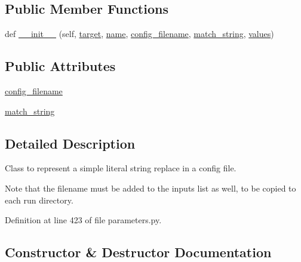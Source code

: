 \subsection*{Public Member Functions}
\begin{DoxyCompactItemize}
\item 
def \hyperlink{classcodar_1_1cheetah_1_1parameters_1_1_param_config_abd78d773a411f8f4ec4b1cddec865644}{\+\_\+\+\_\+init\+\_\+\+\_\+} (self, \hyperlink{classcodar_1_1cheetah_1_1parameters_1_1_param_a5603d43a20cfc6447c3718406ce0669e}{target}, \hyperlink{classcodar_1_1cheetah_1_1parameters_1_1_param_ac9982d62cd18a368a3fbc26541e14209}{name}, \hyperlink{classcodar_1_1cheetah_1_1parameters_1_1_param_config_a1ea95ac063d51462e652eb8dc4aa22e2}{config\+\_\+filename}, \hyperlink{classcodar_1_1cheetah_1_1parameters_1_1_param_config_a00bbc6874525462353e4b2b8d187dcce}{match\+\_\+string}, \hyperlink{classcodar_1_1cheetah_1_1parameters_1_1_param_aefcc82658f511bddd6605e6ac6e74fbf}{values})
\end{DoxyCompactItemize}
\subsection*{Public Attributes}
\begin{DoxyCompactItemize}
\item 
\hyperlink{classcodar_1_1cheetah_1_1parameters_1_1_param_config_a1ea95ac063d51462e652eb8dc4aa22e2}{config\+\_\+filename}
\item 
\hyperlink{classcodar_1_1cheetah_1_1parameters_1_1_param_config_a00bbc6874525462353e4b2b8d187dcce}{match\+\_\+string}
\end{DoxyCompactItemize}


\subsection{Detailed Description}
\begin{DoxyVerb}Class to represent a simple literal string replace in a config file.

Note that the filename must be added to the inputs list as well, to be
copied to each run directory.
\end{DoxyVerb}
 

Definition at line 423 of file parameters.\+py.



\subsection{Constructor \& Destructor Documentation}
\mbox{\label{classcodar_1_1cheetah_1_1parameters_1_1_param_config_abd78d773a411f8f4ec4b1cddec865644}} 
